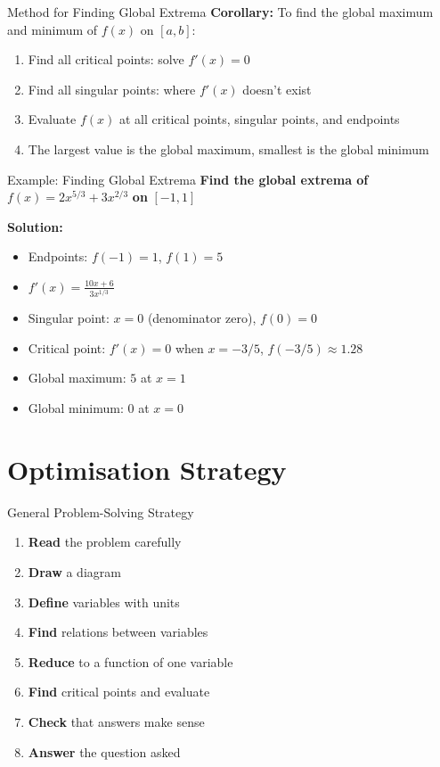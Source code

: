 \documentclass[aspectratio=169]{beamer}
\begin{document}
\begin{frame}{Method for Finding Global Extrema}
\textbf{Corollary:} To find the global maximum and minimum of $f(x)$ on $[a,b]$:

\begin{enumerate}
    \item Find all critical points: solve $f'(x) = 0$
    \item Find all singular points: where $f'(x)$ doesn't exist
    \item Evaluate $f(x)$ at all critical points, singular points, and endpoints
    \item The largest value is the global maximum, smallest is the global minimum
\end{enumerate}
\end{frame}

\begin{frame}{Example: Finding Global Extrema}
\textbf{Find the global extrema of} $f(x) = 2x^{5/3} + 3x^{2/3}$ \textbf{on} $[-1,1]$

\textbf{Solution:}
\begin{itemize}
    \item Endpoints: $f(-1) = 1$, $f(1) = 5$
    \item $f'(x) = \frac{10x + 6}{3x^{1/3}}$
    \item Singular point: $x = 0$ (denominator zero), $f(0) = 0$
    \item Critical point: $f'(x) = 0$ when $x = -3/5$, $f(-3/5) \approx 1.28$
    \item Global maximum: $5$ at $x = 1$
    \item Global minimum: $0$ at $x = 0$
\end{itemize}
\end{frame}

\section{Optimisation Strategy}

\begin{frame}{General Problem-Solving Strategy}
\begin{enumerate}
    \item \textbf{Read} the problem carefully
    \item \textbf{Draw} a diagram
    \item \textbf{Define} variables with units
    \item \textbf{Find} relations between variables
    \item \textbf{Reduce} to a function of one variable
    \item \textbf{Find} critical points and evaluate
    \item \textbf{Check} that answers make sense
    \item \textbf{Answer} the question asked
\end{enumerate}
\end{frame}
\end{document}
